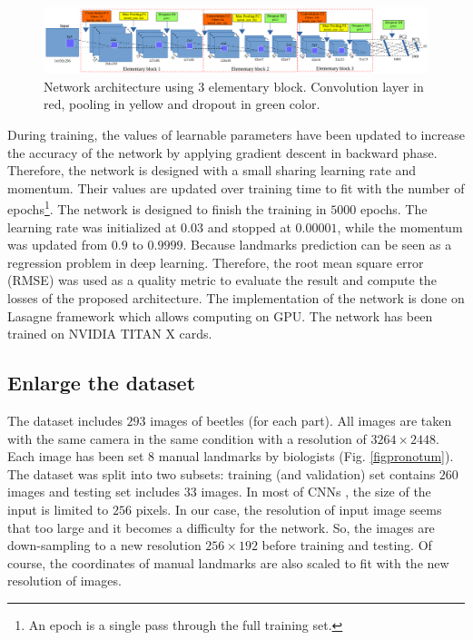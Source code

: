 \documentclass[10pt]{article}
\begin{document}
\begin{figure}[!t]
\centering
\includegraphics[scale=0.32]{images/arch_model}
\caption{{\small{Network architecture using $3$ elementary block.
  Convolution
  layer in red, pooling in yellow and dropout in green color.}}} 
\label{cnnnetwork2}
\end{figure}

During training, the values of learnable parameters have been updated to increase the accuracy of the network by applying gradient descent in backward phase. Therefore, the network is designed with a small sharing learning rate and momentum. Their values are updated over training time to fit with the number of epochs\footnote{An epoch is a single pass through the full training set.}. The network is designed to finish the training in $5000$ epochs. The learning rate was initialized at $0.03$ and stopped at $0.00001$, while the momentum was updated from $0.9$ to $0.9999$. 
Because landmarks prediction can be seen as a regression problem in deep learning. Therefore, the root mean square error (RMSE) was used as a quality metric to evaluate the result and compute the losses of the proposed architecture. The implementation of the network is done on Lasagne framework \cite{lasagne} which allows computing on GPU. The network has been trained on NVIDIA TITAN X cards.

\subsection{Enlarge the dataset}
\label{sec_data}
The dataset includes $293$ images of beetles (for each part). All images are taken with the same camera in the same condition with a resolution of $3264 \times 2448$. Each image has been set $8$ manual landmarks by biologists (Fig. \ref{figpronotum}). The dataset was split into two subsets: training (and validation) set contains $260$ images and testing set includes $33$ images. In most of CNNs \cite{lecun2010convolutional, sun2013deep,  krizhevsky2012imagenet, cintas2016automatic}, the size of the input is limited to $256$ pixels. In our case, the resolution of input image seems that too large and it becomes a difficulty for the network. So, the images are down-sampling to a new resolution $256 \times 192$ before training and testing. Of course, the coordinates of manual landmarks are also scaled to fit with the new resolution of images.
\end{document}
